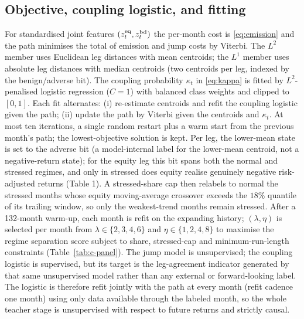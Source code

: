 \subsection*{Objective, coupling logistic, and fitting}
For standardised joint features $(z^{\mathrm{eq}}_t,z^{\mathrm{bd}}_t)$ the per-month cost is \eqref{eq:emission} and
the path minimises the total of emission and jump costs by Viterbi. The $L^2$ member uses
Euclidean leg distances with mean centroids; the $L^1$ member uses absolute leg distances
with median centroids (two centroids per leg, indexed by the benign/adverse bit). The
coupling probability $\kappa_t$ in \eqref{eq:kappa} is fitted by $L^2$-penalised logistic regression
($C=1$) with balanced class weights and clipped to $[0,1]$. Each fit alternates: (i)
re-estimate centroids and refit the coupling logistic given the path; (ii) update the
path by Viterbi given the centroids and $\kappa_t$. At most ten iterations, a single random restart
plus a warm start from the previous month's path; the lowest-objective solution is kept. Per leg, the lower-mean state is set to the adverse bit (a model-internal label for the lower-mean centroid, not a negative-return state); for the equity leg this bit spans both the normal and stressed regimes, and only in stressed does equity realise genuinely negative risk-adjusted returns (Table 1). A stressed-share cap then relabels to normal
the stressed months whose equity moving-average crossover exceeds the $18\%$ quantile of its
trailing window, so only the weakest-trend months remain stressed. After a 132-month
warm-up, each month is refit on the expanding history; $(\lambda,\eta)$ is selected per month
from $\lambda\in\{2,3,4,6\}$ and $\eta\in\{1,2,4,8\}$ to maximise the regime separation score
subject to share, stressed-cap and minimum-run-length constraints (Table~\ref{tab:c-panel}).
The jump model is unsupervised; the coupling logistic is supervised, but its target is the
leg-agreement indicator generated by that same unsupervised model rather than any external or
forward-looking label. The logistic is therefore refit jointly with the path at every month
(refit cadence one month) using only data available through the labeled month, so the whole
teacher stage is unsupervised with respect to future returns and strictly causal.

